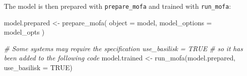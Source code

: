 \documentclass[
]{book}
\newenvironment{Shaded}{\begin{snugshade}}{\end{snugshade}}
\newcommand{\AttributeTok}[1]{\textcolor[rgb]{0.77,0.63,0.00}{#1}}
\newcommand{\CommentTok}[1]{\textcolor[rgb]{0.56,0.35,0.01}{\textit{#1}}}
\newcommand{\ConstantTok}[1]{\textcolor[rgb]{0.00,0.00,0.00}{#1}}
\newcommand{\FunctionTok}[1]{\textcolor[rgb]{0.00,0.00,0.00}{#1}}
\newcommand{\NormalTok}[1]{#1}
\newcommand{\OtherTok}[1]{\textcolor[rgb]{0.56,0.35,0.01}{#1}}
\begin{document}
The model is then prepared with \texttt{prepare\_mofa} and trained with \texttt{run\_mofa}:

\begin{Shaded}
\begin{Highlighting}[]
\NormalTok{model.prepared }\OtherTok{\textless{}{-}} \FunctionTok{prepare\_mofa}\NormalTok{(}
  \AttributeTok{object =}\NormalTok{ model,}
  \AttributeTok{model\_options =}\NormalTok{ model\_opts}
\NormalTok{)}

\CommentTok{\# Some systems may require the specification \textasciigrave{}use\_basilisk = TRUE\textasciigrave{}}
\CommentTok{\# so it has been added to the following code}
\NormalTok{model.trained }\OtherTok{\textless{}{-}} \FunctionTok{run\_mofa}\NormalTok{(model.prepared, }\AttributeTok{use\_basilisk =} \ConstantTok{TRUE}\NormalTok{)}
\end{Highlighting}
\end{Shaded}
\end{document}
